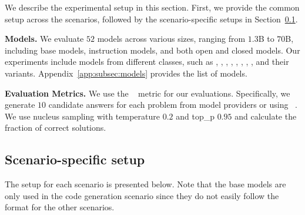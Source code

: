 We describe the experimental setup in this section.
First, we provide the common setup across the scenarios, followed by the scenario-specific setups in Section~\ref{subsec:scenario_specific_setup}.

\noindent \textbf{Models.} 
We evaluate $52$ models across various sizes, ranging from $1.3$B to $70$B, including base models, instruction models, and both open and closed models. 
Our experiments include models from different classes, such as \gpts{}, \claudes{}, \geminis{}, \mistral{}, \llamas{}, \deepseeks{}, \cllamas{}, \starcodertwo{}, \codeqwen{} and their variants.
Appendix~\ref{app:subsec:models} provides the list of models. %

\noindent \textbf{Evaluation Metrics.}
We use the ~\citep{kulal2019spoc,chen2021evaluating} metric for our evaluations. 
Specifically, we generate $10$ candidate answers for each problem from model providers or using ~\citep{kwon2023efficient}.
We use nucleus sampling with temperature $0.2$ and top\_p $0.95$ and calculate the fraction of correct solutions.%

\subsection{Scenario-specific setup}
\label{subsec:scenario_specific_setup}
The setup for each scenario is presented below.
Note that the base models are only used in the code generation scenario since they do not easily follow the format for the other scenarios.

